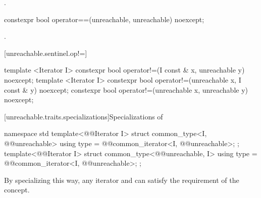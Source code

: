 \begin{addedblock}
\begin{itemdescr}
\pnum
\returns {}.
\end{itemdescr}

\begin{itemdecl}
constexpr bool operator==(unreachable, unreachable) noexcept;
\end{itemdecl}

\begin{itemdescr}
\pnum
\returns {}.
\end{itemdescr}

[unreachable.sentinel.op!=]{}

%
%
\begin{itemdecl}
template <Iterator I>
  constexpr bool operator!=(I const & x, unreachable y) noexcept;
template <Iterator I>
  constexpr bool operator!=(unreachable x, I const & y) noexcept;
constexpr bool operator!=(unreachable x, unreachable y) noexcept;
\end{itemdecl}

\begin{itemdescr}
\pnum
\returns
{}
\end{itemdescr}

[unreachable.traits.specializations]{Specializations of }

%
\begin{itemdecl}
namespace std {
  template<@@Iterator I>
  struct common_type<I, @@unreachable> {
    using type = @@common_iterator<I, @@unreachable>;
  };
  template<@@Iterator I>
  struct common_type<@@unreachable, I> {
    using type = @@common_iterator<I, @@unreachable>;
  };
}
\end{itemdecl}

\begin{itemdescr}
\pnum
\enternote By specializing  this way, any iterator and
 can satisfy the  requirement of the
 concept.\exitnote
\end{itemdescr}

\end{addedblock}

